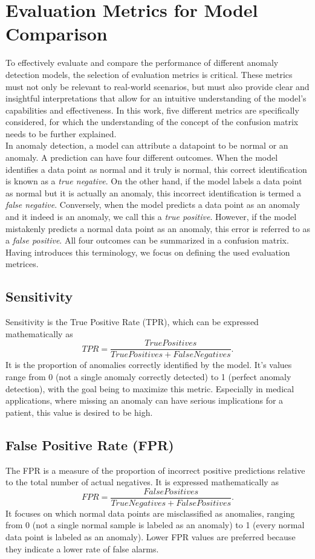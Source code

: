 \section{Evaluation Metrics for Model Comparison}
To effectively evaluate and compare the performance of different anomaly detection models, the selection of evaluation metrics is critical. These metrics must not only be relevant to real-world scenarios, but must also provide clear and insightful interpretations that allow for an intuitive understanding of the model's capabilities and effectiveness. In this work, five different metrics are specifically considered, for which the understanding of the concept of the confusion matrix needs to be further explained. \\
In anomaly detection, a model can attribute a datapoint to be normal or an anomaly. A prediction can have four different outcomes. When the model identifies a data point as normal and it truly is normal, this correct identification is known as a \textit{true negative}. On the other hand, if the model labels a data point as normal but it is actually an anomaly, this incorrect identification is termed a \textit{false negative}. Conversely, when the model predicts a data point as an anomaly and it indeed is an anomaly, we call this a \textit{true positive}. However, if the model mistakenly predicts a normal data point as an anomaly, this error is referred to as a \textit{false positive}. All four outcomes can be summarized in a confusion matrix. \\


Having introduces this terminology, we focus on defining the used evaluation metrices.
\subsection{Sensitivity}
Sensitivity is the True Positive Rate (TPR), which can be expressed mathematically as \[ TPR=\frac{TruePositives}{TruePositives+FalseNegatives}. \] It is the proportion of anomalies correctly identified by the model. It's values range from 0 (not a single anomaly correctly detected) to 1 (perfect anomaly detection), with the goal being to maximize this metric. Especially in medical applications, where missing an anomaly can have serious implications for a patient, this value is desired to be high.
\subsection{False Positive Rate (FPR)}
The FPR is a measure of the proportion of incorrect positive predictions relative to the total number of actual negatives. It is expressed mathematically as \[ FPR=\frac{FalsePositives}{TrueNegatives+FalsePositives}. \] It focuses on which normal data points are misclassified as anomalies, ranging from 0 (not a single normal sample is labeled as an anomaly) to 1 (every normal data point is labeled as an anomaly). Lower FPR values are preferred because they indicate a lower rate of false alarms.\\
